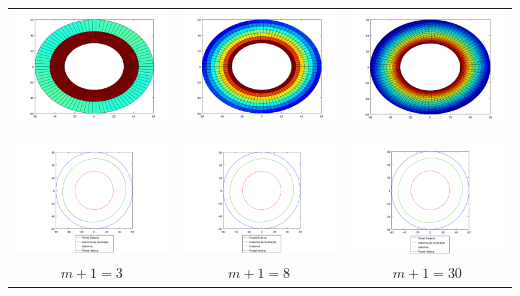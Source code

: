             {\centering \begin{tabular}{ccc}
              \includegraphics[width=4.5cm]{graficos/exp4/seno/exp4-seno-rad-3.png} &
              \includegraphics[width=4.5cm]{graficos/exp4/seno/exp4-seno-rad-8.png} &
              \includegraphics[width=4.5cm]{graficos/exp4/seno/exp4-seno-rad-30.png} \\
              \includegraphics[width=5cm]{graficos/exp4/seno/exp4-seno-rad-3-iso.png} &
              \includegraphics[width=5cm]{graficos/exp4/seno/exp4-seno-rad-8-iso.png} &
              \includegraphics[width=5cm]{graficos/exp4/seno/exp4-seno-rad-30-iso.png} \\
              {\small $m+1 = 3$} &
              {\small $m+1 = 8$} &
              {\small $m+1 = 30$} \\
            \end{tabular}}

